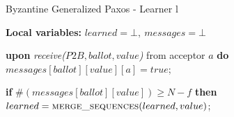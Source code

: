 \begin{algorithm}
	\caption{Byzantine Generalized Paxos - Learner l}
	\label{BFT-Learn}
	\textbf{Local variables:} $learned = \bot,\ messages = \bot$ 
	\begin{algorithmic}[1]
		\State \textbf{upon} \textit{receive($P2B, ballot, value$)} from acceptor $a$ \textbf{do}
		\State \hspace{\algorithmicindent} $messages[ballot][value][a] = true$;
		
		\State \hspace{\algorithmicindent} \textbf{if} $\#(messages[ballot][value]) \geq N-f$ \textbf{then}
		\State \hspace{\algorithmicindent}\hspace{\algorithmicindent}\hspace{\algorithmicindent}\hspace{\algorithmicindent}
		$learned = \Call{merge\_sequences}{learned, value}$;
	\end{algorithmic}
\end{algorithm}